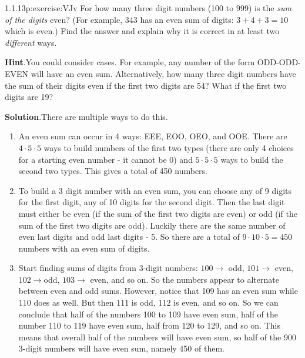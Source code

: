 \documentclass[twoside,11pt,]{book}
\newcommand{\blocktitlefont}{\relax}
\numberwithin{equation}{chapter}
\begin{document}
\begin{divisionsolution}{1.1.13}{}{p:exercise:VJv}%
For how many three digit numbers (100 to 999) is the \emph{sum of the digits} even? (For example, \(343\) has an even sum of digits: \(3+4+3 = 10\) which is even.) Find the answer and explain why it is correct in at least two \emph{different} ways.%
\par\smallskip%
\noindent\textbf{\blocktitlefont Hint}.\quad{}You could consider cases.  For example, any number of the form ODD-ODD-EVEN will have an even sum.  Alternatively, how many three digit numbers have the sum of their digits even if the first two digits are 54?  What if the first two digits are 19?%
\par\smallskip%
\noindent\textbf{\blocktitlefont Solution}.\quad{}There are multiple ways to do this.%
\begin{enumerate}[label=(\alph*)]
\item{}An even sum can occur in 4 ways: EEE, EOO, OEO, and OOE. There are \(4 \cdot 5 \cdot 5\) ways to build numbers of the first two types (there are only 4 choices for a starting even number - it cannot be 0) and \(5 \cdot 5 \cdot 5\) ways to build the second two types. This gives a total of 450 numbers.%
\item{}To build a 3 digit number with an even sum, you can choose any of 9 digits for the first digit, any of 10 digits for the second digit. Then the last digit must either be even (if the sum of the first two digits are even) or odd (if the sum of the first two digits are odd). Luckily there are the same number of even last digits and odd last digits - 5. So there are a total of \(9 \cdot 10 \cdot 5 = 450\) numbers with an even sum of digits.%
\item{}Start finding sums of digits from 3-digit numbers: \(100 \to\) odd, \(101 \to\) even, \(102 \to\)odd, \(103 \to\) even, and so on. So the numbers appear to alternate between even and odd sums. However, notice that 109 has an even sum while 110 does as well. But then 111 is odd, 112 is even, and so on. So we can conclude that half of the numbers 100 to 109 have even sum, half of the number 110 to 119 have even sum, half from 120 to 129, and so on. This means that overall half of the numbers will have even sum, so half of the 900 3-digit numbers will have even sum, namely 450 of them.%
\end{enumerate}
%
\end{divisionsolution}%
\end{document}
